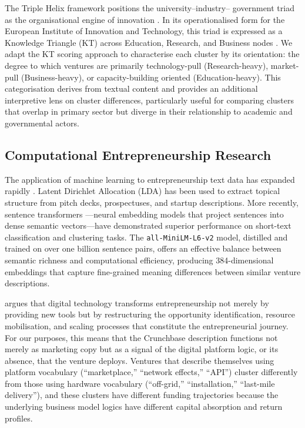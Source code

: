 \documentclass[review,12pt]{elsarticle}
\begin{document}
The Triple Helix framework positions the university--industry--%
government triad as the organisational engine of innovation
\citep{etzkowitz2000dynamics}. In its operationalised form for the
European Institute of Innovation and Technology, this triad is
expressed as a Knowledge Triangle (KT) across Education, Research,
and Business nodes \citep{maass2018data}. We adapt the KT scoring
approach to characterise each cluster by its orientation: the degree
to which ventures are primarily technology-pull (Research-heavy),
market-pull (Business-heavy), or capacity-building oriented
(Education-heavy). This categorisation derives from textual content
and provides an additional interpretive lens on cluster differences,
particularly useful for comparing clusters that overlap in primary
sector but diverge in their relationship to academic and governmental
actors.

\subsection{Computational Entrepreneurship Research}

The application of machine learning to entrepreneurship text data has
expanded rapidly \citep{grimmer2021machine}. Latent Dirichlet
Allocation (LDA) \citep{blei2003latent} has been used to extract
topical structure from pitch decks, prospectuses, and startup
descriptions. More recently, sentence transformers
\citep{reimers2019sentence}---neural embedding models that project
sentences into dense semantic vectors---have demonstrated superior
performance on short-text classification and clustering tasks. The
\texttt{all-MiniLM-L6-v2} model, distilled and trained on over one
billion sentence pairs, offers an effective balance between semantic
richness and computational efficiency, producing 384-dimensional
embeddings that capture fine-grained meaning differences between
similar venture descriptions.

\citet{nambisan2017digital} argues that digital technology transforms
entrepreneurship not merely by providing new tools but by
restructuring the opportunity identification, resource mobilisation,
and scaling processes that constitute the entrepreneurial journey.
For our purposes, this means that the Crunchbase description functions
not merely as marketing copy but as a signal of the digital platform
logic, or its absence, that the venture deploys. Ventures that
describe themselves using platform vocabulary (``marketplace,''
``network effects,'' ``API'') cluster differently from those using
hardware vocabulary (``off-grid,'' ``installation,'' ``last-mile
delivery''), and these clusters have different funding trajectories
because the underlying business model logics have different capital
absorption and return profiles.
\end{document}
